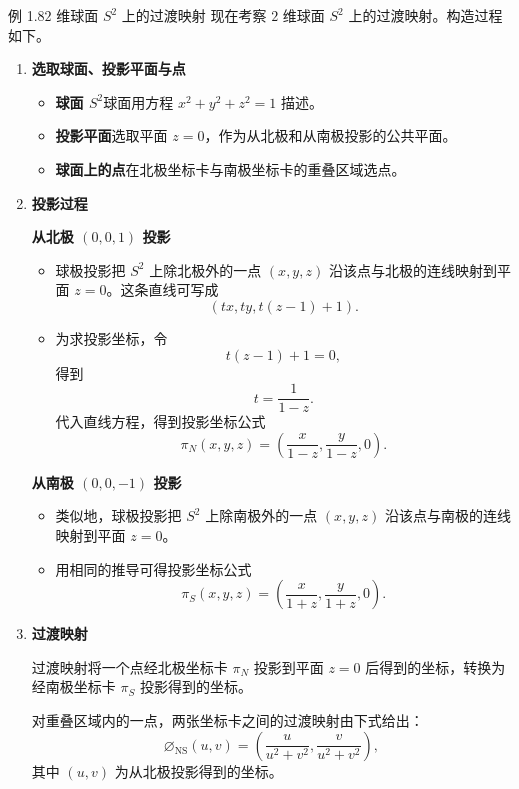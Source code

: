 \begin{statement}{例 1.8}{$2$ 维球面 $S^2$ 上的过渡映射}
现在考察 $2$ 维球面 $S^2$ 上的过渡映射。构造过程如下。
\begin{enumerate}
  \item \textbf{选取球面、投影平面与点}
  \begin{itemize}
    \item \textbf{球面 $S^2$}\quad 球面用方程 $x^2+y^2+z^2=1$ 描述。
    \item \textbf{投影平面}\quad 选取平面 $z=0$，作为从北极和从南极投影的公共平面。
    \item \textbf{球面上的点}\quad 在北极坐标卡与南极坐标卡的重叠区域选点。
  \end{itemize}
  \item \textbf{投影过程}
  
  \textbf{从北极 $(0,0,1)$ 投影}
  \begin{itemize}
    \item 球极投影把 $S^2$ 上除北极外的一点 $(x,y,z)$ 沿该点与北极的连线映射到平面 $z=0$。这条直线可写成
    \[
      (tx,ty,t(z-1)+1).
    \]
    \item 为求投影坐标，令
    \[
      t(z-1)+1=0,
    \]
    得到
    \[
      t=\frac{1}{1-z}.
    \]
    代入直线方程，得到投影坐标公式
    \[
      \pi_N(x,y,z)=\left(\frac{x}{1-z},\frac{y}{1-z},0\right).
    \]
  \end{itemize}
  \textbf{从南极 $(0,0,-1)$ 投影}
  \begin{itemize}
    \item 类似地，球极投影把 $S^2$ 上除南极外的一点 $(x,y,z)$ 沿该点与南极的连线映射到平面 $z=0$。
    \item 用相同的推导可得投影坐标公式
    \[
      \pi_S(x,y,z)=\left(\frac{x}{1+z},\frac{y}{1+z},0\right).
    \]
  \end{itemize}
  \item \textbf{过渡映射}
  
  过渡映射将一个点经北极坐标卡 $\pi_N$ 投影到平面 $z=0$ 后得到的坐标，转换为经南极坐标卡 $\pi_S$ 投影得到的坐标。
  
  对重叠区域内的一点，两张坐标卡之间的过渡映射由下式给出：
  \[
    \varnothing_{\mathrm{NS}}(u,v)
    =\left(\frac{u}{u^2+v^2},\frac{v}{u^2+v^2}\right),
  \]
  其中 $(u,v)$ 为从北极投影得到的坐标。
\end{enumerate}
\end{statement}
